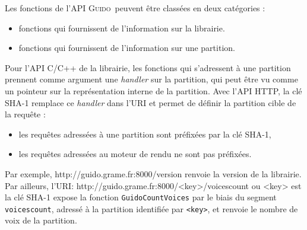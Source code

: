 \documentclass{article}
\newenvironment{code}		{\vspace{-2mm} \fontsize{8.5pt}{12pt}\selectfont \verbatim}{\endverbatim\vspace{-2mm}}
\newcommand{\guido}		{\textsc{Guido}}
\begin{document}
Les fonctions de l'API \guido\ peuvent être classées en deux catégories :
\begin{itemize}[noitemsep]
\item fonctions qui fournissent de l'information sur la librairie.
\item fonctions qui fournissent de l'information sur une partition.
\end{itemize}

Pour l'API C/C++ de la librairie, les fonctions qui s'adressent à une partition prennent comme argument une \emph{handler} sur la partition, qui peut être vu comme un pointeur sur la représentation interne de la partition. Avec l'API HTTP, la clé SHA-1 remplace ce \emph{handler} dans l'URI et permet de définir la partition cible de la requête :
\begin{itemize}[noitemsep]
\item les requêtes adressées à une partition sont préfixées par la clé SHA-1,
\item les requêtes adressées au moteur de rendu ne sont pas préfixées.
\end{itemize}
Par exemple,
\begin{code}
  http://guido.grame.fr:8000/version
\end{code}
renvoie la version de la librairie. \\
Par ailleurs, l'URI:
\begin{code}
  http://guido.grame.fr:8000/<key>/voicescount
         ou <key> est la clé SHA-1
\end{code}
expose la fonction \verb=GuidoCountVoices= par le biais du segment \verb=voicescount=, adressé à la partition identifiée par \verb=<key>=, et renvoie le nombre de voix de la partition.
\end{document}
